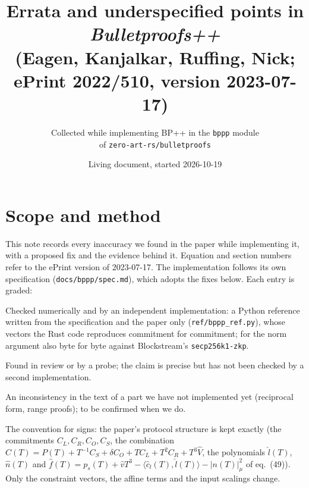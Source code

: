 \documentclass[11pt,a4paper]{article}
\title{Errata and underspecified points in \emph{Bulletproofs++}\\[2pt]
\large (Eagen, Kanjalkar, Ruffing, Nick; ePrint 2022/510, version 2023-07-17)}
\author{Collected while implementing BP++ in the \texttt{bppp} module\\
of \texttt{zero-art-rs/bulletproofs}}
\date{Living document, started 2026-10-19}
\begin{document}
\maketitle

\section*{Scope and method}

This note records every inaccuracy we found in the paper while implementing it, with a
proposed fix and the evidence behind it. Equation and section numbers refer to the ePrint
version of 2023-07-17. The implementation follows its own specification
(\texttt{docs/bppp/spec.md}), which adopts the fixes below. Each entry is graded:

\begin{description}[leftmargin=2em,style=nextline]
  \item[Verified] Checked numerically and by an independent implementation: a Python reference
    written from the specification and the paper only (\texttt{ref/bppp\_ref.py}), whose vectors
    the Rust code reproduces commitment for commitment; for the norm argument also byte for byte
    against Blockstream's \texttt{secp256k1-zkp}.
  \item[Observed] Found in review or by a probe; the claim is precise but has not been checked by
    a second implementation.
  \item[Noted] An inconsistency in the text of a part we have not implemented yet (reciprocal
    form, range proofs); to be confirmed when we do.
\end{description}

The convention for signs: the paper's protocol structure is kept exactly (the commitments
$C_L, C_R, C_O, C_S$, the combination
$C(T) = P(T) + T^{-1}C_S + \delta C_O + T C_L + T^2 C_R + T^3 \hat V$, the polynomials
$\hat l(T)$, $\hat n(T)$ and
$\hat f(T) = p_s(T) + \hat v T^3 - \langle \hat c_l(T), \hat l(T)\rangle - |n(T)|^2_\mu$ of
eq.~(49)). Only the constraint vectors, the affine terms and the input scalings change.
\end{document}

